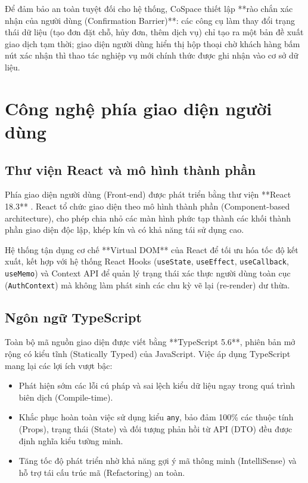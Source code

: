 Để đảm bảo an toàn tuyệt đối cho hệ thống, CoSpace thiết lập **rào chắn xác nhận của người dùng (Confirmation Barrier)**: các công cụ làm thay đổi trạng thái dữ liệu (tạo đơn đặt chỗ, hủy đơn, thêm dịch vụ) chỉ tạo ra một bản đề xuất giao dịch tạm thời; giao diện người dùng hiển thị hộp thoại chờ khách hàng bấm nút xác nhận thì thao tác nghiệp vụ mới chính thức được ghi nhận vào cơ sở dữ liệu.

\section{Công nghệ phía giao diện người dùng}
\label{sec:cn_frontend}

\subsection{Thư viện React và mô hình thành phần}
Phía giao diện người dùng (Front-end) được phát triển bằng thư viện **React 18.3** \cite{react_docs}. React tổ chức giao diện theo mô hình thành phần (Component-based architecture), cho phép chia nhỏ các màn hình phức tạp thành các khối thành phần giao diện độc lập, khép kín và có khả năng tái sử dụng cao.

Hệ thống tận dụng cơ chế **Virtual DOM** của React để tối ưu hóa tốc độ kết xuất, kết hợp với hệ thống React Hooks (\texttt{useState}, \texttt{useEffect}, \texttt{useCallback}, \texttt{useMemo}) và Context API để quản lý trạng thái xác thực người dùng toàn cục (\texttt{AuthContext}) mà không làm phát sinh các chu kỳ vẽ lại (re-render) dư thừa.

\subsection{Ngôn ngữ TypeScript}
Toàn bộ mã nguồn giao diện được viết bằng **TypeScript 5.6**, phiên bản mở rộng có kiểu tĩnh (Statically Typed) của JavaScript. Việc áp dụng TypeScript mang lại các lợi ích vượt bậc:
\begin{itemize}
    \item Phát hiện sớm các lỗi cú pháp và sai lệch kiểu dữ liệu ngay trong quá trình biên dịch (Compile-time).
    \item Khắc phục hoàn toàn việc sử dụng kiểu \texttt{any}, bảo đảm 100\% các thuộc tính (Props), trạng thái (State) và đối tượng phản hồi từ API (DTO) đều được định nghĩa kiểu tường minh.
    \item Tăng tốc độ phát triển nhờ khả năng gợi ý mã thông minh (IntelliSense) và hỗ trợ tái cấu trúc mã (Refactoring) an toàn.
\end{itemize}

